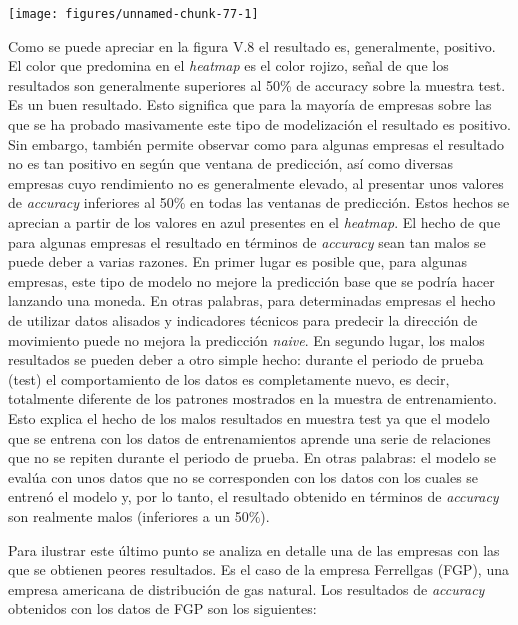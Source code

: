 \documentclass[]{DissertateUSU}
\begin{document}
\begin{center}\texttt{[image: figures/unnamed-chunk-77-1]} \end{center}
\centering

\setlength\parskip{5ex}
\justifying

\noindent Como se puede apreciar en la figura V.8 el resultado es,
generalmente, positivo. El color que predomina en el \emph{heatmap} es
el color rojizo, señal de que los resultados son generalmente superiores
al 50\% de accuracy sobre la muestra test. Es un buen resultado. Esto
significa que para la mayoría de empresas sobre las que se ha probado
masivamente este tipo de modelización el resultado es positivo. Sin
embargo, también permite observar como para algunas empresas el
resultado no es tan positivo en según que ventana de predicción, así
como diversas empresas cuyo rendimiento no es generalmente elevado, al
presentar unos valores de \emph{accuracy} inferiores al 50\% en todas
las ventanas de predicción. Estos hechos se aprecian a partir de los
valores en azul presentes en el \emph{heatmap}. El hecho de que para
algunas empresas el resultado en términos de \emph{accuracy} sean tan
malos se puede deber a varias razones. En primer lugar es posible que,
para algunas empresas, este tipo de modelo no mejore la predicción base
que se podría hacer lanzando una moneda. En otras palabras, para
determinadas empresas el hecho de utilizar datos alisados y indicadores
técnicos para predecir la dirección de movimiento puede no mejora la
predicción \emph{naive}. En segundo lugar, los malos resultados se
pueden deber a otro simple hecho: durante el periodo de prueba (test) el
comportamiento de los datos es completamente nuevo, es decir, totalmente
diferente de los patrones mostrados en la muestra de entrenamiento. Esto
explica el hecho de los malos resultados en muestra test ya que el
modelo que se entrena con los datos de entrenamientos aprende una serie
de relaciones que no se repiten durante el periodo de prueba. En otras
palabras: el modelo se evalúa con unos datos que no se corresponden con
los datos con los cuales se entrenó el modelo y, por lo tanto, el
resultado obtenido en términos de \emph{accuracy} son realmente malos
(inferiores a un 50\%).

\noindent Para ilustrar este último punto se analiza en detalle una de
las empresas con las que se obtienen peores resultados. Es el caso de la
empresa Ferrellgas (FGP), una empresa americana de distribución de gas
natural. Los resultados de \emph{accuracy} obtenidos con los datos de
FGP son los siguientes:
\end{document}
